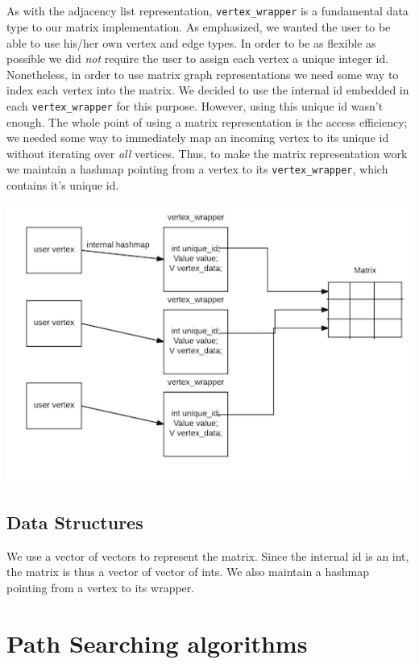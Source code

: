\documentclass[12pt]{article}
\begin{document}
\subsection{}
As with the adjacency list representation, \texttt{vertex\_wrapper} is a fundamental data type to our matrix implementation. As emphasized, we wanted the user to be able to use his/her own vertex and edge types. In order to be as flexible as possible we did \emph{not} require the user to assign each vertex a unique integer id. Nonetheless, in order to use matrix graph representations we need some way to index each vertex into the matrix. We decided to use the internal id embedded in each \texttt{vertex\_wrapper} for this purpose. However, using this unique id wasn't enough. The whole point of using a matrix representation is the access efficiency; we needed some way to immediately map an incoming vertex to its unique id without iterating over \emph{all} vertices. Thus, to make the matrix representation work we maintain a hashmap pointing from a vertex to its \texttt{vertex\_wrapper}, which contains it's unique id. 

\includegraphics{matrix}

\subsection{Data Structures}
We use a vector of vectors to represent the matrix. Since the internal id is an int, the matrix is thus a vector of vector of ints. We also maintain a hashmap pointing from a vertex to its wrapper.

\section{Path Searching algorithms}
\end{document}
